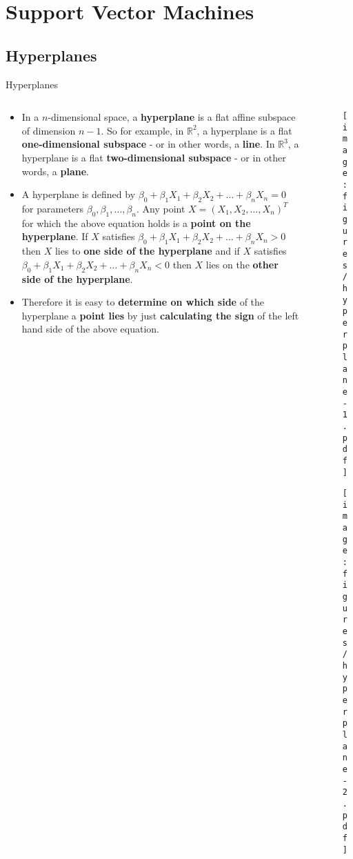 \documentclass[document.tex]{subfiles}
\begin{document}
    \section{Support Vector Machines}
        
    \subsection{Hyperplanes}

    \begin{frame}{Hyperplanes}
        \begin{columns}
            \begin{column}{0.6\textwidth}
                \begin{itemize}
                    \item In a $n$-dimensional space, a \textbf{hyperplane} is a flat affine subspace of dimension $n - 1$. So for example, in $\mathbb{R}^2$, a hyperplane is a flat \textbf{one-dimensional subspace} - or in other words, a \textbf{line}. In $\mathbb{R}^3$, a hyperplane is a flat \textbf{two-dimensional subspace} - or in other words, a \textbf{plane}.
                    \item A hyperplane is defined by $\beta_0 + \beta_1X_1 + \beta_2X_2 + \dots + \beta_nX_n = 0$ for parameters $\beta_0, \beta_1, \dots, \beta_n$. Any point $X = (X_1, X_2, \dots, X_n)^T$ for which the above equation holds is a \textbf{point on the hyperplane}. If $X$ satisfies $\beta_0 + \beta_1X_1 + \beta_2X_2 + \dots + \beta_nX_n > 0$ then $X$ lies to \textbf{one side of the hyperplane} and if $X$ satisfies  $\beta_0 + \beta_1X_1 + \beta_2X_2 + \dots + \beta_nX_n < 0$ then $X$ lies on the \textbf{other side of the hyperplane}.
                    \item  Therefore it is easy to \textbf{determine on which side} of the hyperplane a \textbf{point lies} by just \textbf{calculating the sign} of the left hand side of the above equation.
                \end{itemize}
            \end{column}
            \begin{column}{0.4\textwidth}
                \begin{figure}
                    \label{fig:hyperplane-1}
                    \texttt{[image: figures/hyperplane-1.pdf]}
                \end{figure}
                \begin{figure}
                    \label{fig:hyperplane-2}
                    \texttt{[image: figures/hyperplane-2.pdf]}
                \end{figure}
            \end{column}
        \end{columns}
    \end{frame}
\end{document}
